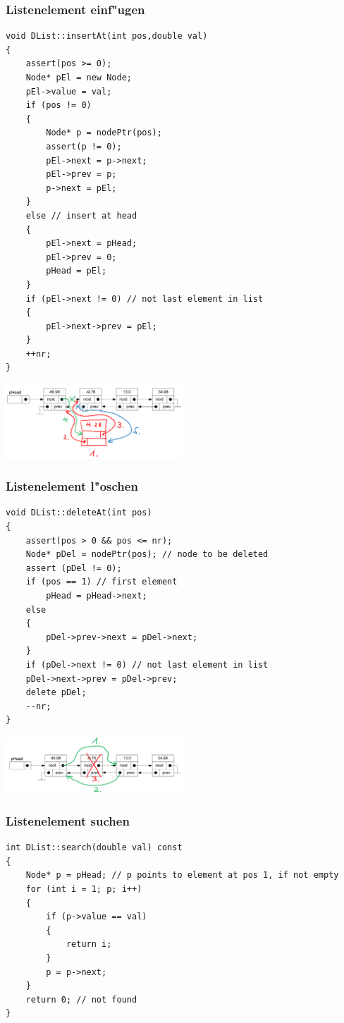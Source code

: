 \subsubsection{Listenelement einf"ugen}
\begin{lstlisting}[style=C]
void DList::insertAt(int pos,double val)
{
	assert(pos >= 0);
	Node* pEl = new Node;
	pEl->value = val;
	if (pos != 0)
	{
		Node* p = nodePtr(pos);
		assert(p != 0);
		pEl->next = p->next;
		pEl->prev = p;
		p->next = pEl;
	}
	else // insert at head
	{
		pEl->next = pHead;
		pEl->prev = 0;
		pHead = pEl;
	}
	if (pEl->next != 0) // not last element in list
	{
		pEl->next->prev = pEl;
	}
	++nr;
}
\end{lstlisting}
\begin{flushleft}
{\includegraphics[width=0.5\textwidth]{images/Listen/DLL_Insert.png}}
\label{Fig: Element bei DLL einf"ugen}
\end{flushleft}

\subsubsection{Listenelement l"oschen}
\begin{lstlisting}[style=C]
void DList::deleteAt(int pos)
{
	assert(pos > 0 && pos <= nr);
	Node* pDel = nodePtr(pos); // node to be deleted
	assert (pDel != 0);
	if (pos == 1) // first element
		pHead = pHead->next;
	else
	{
		pDel->prev->next = pDel->next;
	}
	if (pDel->next != 0) // not last element in list
	pDel->next->prev = pDel->prev;
	delete pDel;
	--nr;
}
\end{lstlisting}
\begin{flushleft}
{\includegraphics[width=0.5\textwidth]{images/Listen/DLL_Delete.png}}
\label{Fig: Element bei DLL l"oschen}
\end{flushleft}

\subsubsection{Listenelement suchen}
\begin{lstlisting}[style=C]
int DList::search(double val) const
{
	Node* p = pHead; // p points to element at pos 1, if not empty
	for (int i = 1; p; i++)
	{
		if (p->value == val)
		{
			return i;
		}
		p = p->next;
	}
	return 0; // not found
}
\end{lstlisting}
